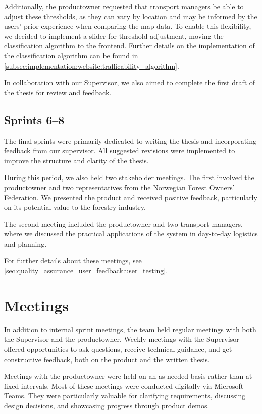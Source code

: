 Additionally, the \gls{productowner} requested that transport managers be able to adjust these thresholds, as they can vary by location and may be informed by the users' prior experience when comparing the map data. To enable this flexibility, we decided to implement a slider for threshold adjustment, moving the classification algorithm to the frontend. Further details on the implementation of the classification algorithm can be found in \autoref{subsec:implementation:website:trafficability_algorithm}.

In collaboration with our Supervisor, we also aimed to complete the first draft of the thesis for review and feedback.

\subsection*{Sprints 6–8}

The final sprints were primarily dedicated to writing the thesis and incorporating feedback from our supervisor. All suggested revisions were implemented to improve the structure and clarity of the thesis.

During this period, we also held two stakeholder meetings. The first involved the \gls{productowner} and two representatives from the Norwegian Forest Owners' Federation. We presented the product and received positive feedback, particularly on its potential value to the forestry industry.

The second meeting included the \gls{productowner} and two transport managers, where we discussed the practical applications of the system in day-to-day logistics and planning.

For further details about these meetings, see \autoref{sec:quality_assurance_user_feedback:user_testing}.

\section{Meetings}\label{sec:devpro:meetings}

In addition to internal sprint meetings, the team held regular meetings with both the Supervisor and the \gls{productowner}. Weekly meetings with the Supervisor offered opportunities to ask questions, receive technical guidance, and get constructive feedback, both on the product and the written thesis.

Meetings with the \gls{productowner} were held on an as-needed basis rather than at fixed intervals. Most of these meetings were conducted digitally via Microsoft Teams. They were particularly valuable for clarifying requirements, discussing design decisions, and showcasing progress through product demos.

